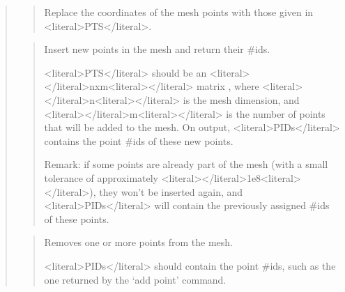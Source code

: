 \documentclass[a4paper,11pt,english]{sphinxmanual}
\begin{document}
\sphinxAtStartPar
{}
\begin{quote}

\sphinxAtStartPar
{}
\begin{quote}

\sphinxAtStartPar
Replace the coordinates of the mesh points with those given in \textless{}literal\textgreater{}PTS\textless{}/literal\textgreater{}.
\end{quote}

\sphinxAtStartPar
{}
\begin{quote}

\sphinxAtStartPar
Insert new points in the mesh and return their \#ids.

\sphinxAtStartPar
\textless{}literal\textgreater{}PTS\textless{}/literal\textgreater{} should be an \textless{}literal\textgreater{}\textless{}/literal\textgreater{}nxm\textless{}literal\textgreater{}\textless{}/literal\textgreater{} matrix , where \textless{}literal\textgreater{}\textless{}/literal\textgreater{}n\textless{}literal\textgreater{}\textless{}/literal\textgreater{} is the mesh
dimension, and \textless{}literal\textgreater{}\textless{}/literal\textgreater{}m\textless{}literal\textgreater{}\textless{}/literal\textgreater{} is the number of points that will be
added to the mesh. On output, \textless{}literal\textgreater{}PIDs\textless{}/literal\textgreater{} contains the point \#ids
of these new points.

\sphinxAtStartPar
Remark: if some points are already part of the mesh (with a small
tolerance of approximately \textless{}literal\textgreater{}\textless{}/literal\textgreater{}1e\sphinxhyphen{}8\textless{}literal\textgreater{}\textless{}/literal\textgreater{}), they won’t be inserted again,
and \textless{}literal\textgreater{}PIDs\textless{}/literal\textgreater{} will contain the previously assigned \#ids of these
points.
\end{quote}

\sphinxAtStartPar
{}
\begin{quote}

\sphinxAtStartPar
Removes one or more points from the mesh.

\sphinxAtStartPar
\textless{}literal\textgreater{}PIDs\textless{}/literal\textgreater{} should contain the point \#ids, such as the one returned by
the ‘add point’ command.
\end{quote}


\end{quote}
\end{document}
